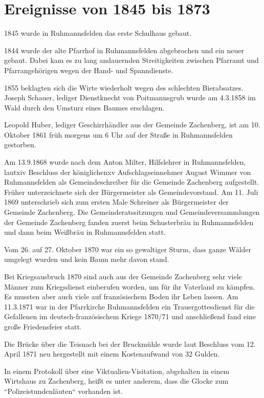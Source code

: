 \documentclass[12pt,a4pager]{book}
\begin{document}
\section{Ereignisse von 1845 bis 1873}

1845 wurde in Ruhmannsfelden das erste Schulhaus gebaut.

1844 wurde der alte Pfarrhof in Ruhmannsfelden abgebrochen und ein neuer gebaut.
Dabei kam es zu lang andauernden Streitigkeiten zwischen Pfarramt und
Pfarrangehörigen wegen der Hand- und Spanndienste.

1855 beklagten sich die Wirte wiederholt wegen des schlechten Bierabsatzes.
Joseph Schauer, lediger Dienstknecht von Poitmannsgrub wurde am 4.3.1858 im Wald
durch den Umsturz eines Baumes erschlagen.

Leopold Huber, lediger Geschirrhändler aus der Gemeinde Zachenberg, ist am 10.
Oktober 1861 früh morgens um 6 Uhr auf der Straße in Ruhmannsfelden gestorben.

Am 13.9.1868 wurde nach dem Anton Milter, Hilfslehrer in Ruhmannsfelden, lautxiv
Beschluss der königlichenxv Aufschlagseinnehmer August Wimmer von Ruhmannsfelden
als Gemeindeschreiber für die Gemeinde Zachenberg aufgestellt. Früher
unterzeichnete sich der Bürgermeister als Gemeindevorstand. Am 11. Juli 1869
unterschrieb sich zum ersten Male Schreiner als Bürgermeister der Gemeinde
Zachenberg. Die Gemeinderatssitzungen und Gemeindeversammlungen der Gemeinde
Zachenberg fanden zuerst beim Schusterbräu in Ruhmannsfelden und dann beim
Weißbräu in Ruhmannsfelden statt.

Vom 26. auf 27. Oktober 1870 war ein so gewaltiger Sturm, dass ganze Wälder
umgelegt wurden und kein Baum mehr davon stand.

Bei Kriegsausbruch 1870 sind auch aus der Gemeinde Zachenberg sehr viele Männer
zum Kriegsdienst einberufen worden, um für ihr Vaterland zu kämpfen. Es mussten
aber auch viele auf französischem Boden ihr Leben lassen. Am 11.3.1871 war in
der Pfarrkirche Ruhmannsfelden ein Trauergottesdienst für die Gefallenen im
deutsch-französischem Kriege 1870/71 und anschließend fand eine große
Friedensfeier statt.

Die Brücke über die Teisnach bei der Bruckmühle wurde laut Beschluss vom 12.
April 1871 neu hergestellt mit einem Kostenaufwand von 32 Gulden.

In einem Protokoll über eine Viktualien-Visitation, abgehalten in einem
Wirtshaus zu Zachenberg, heißt es unter anderem, dass die Glocke zum
“Polizeistundenläuten“ vorhanden ist.
\end{document}
